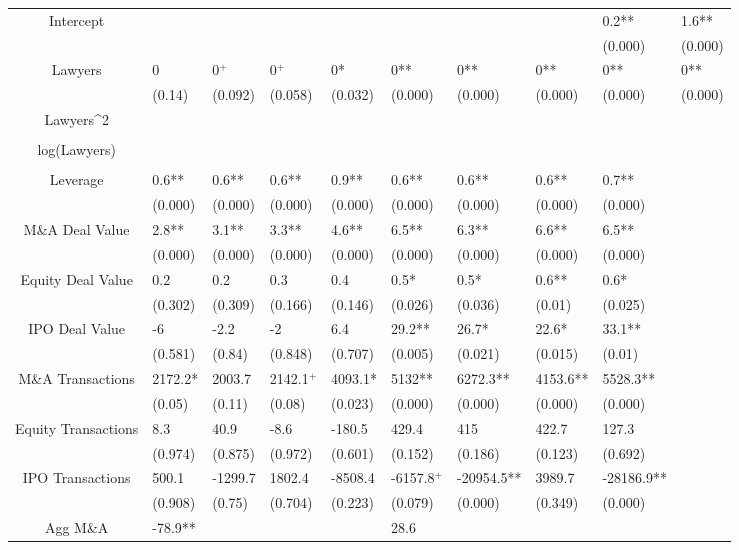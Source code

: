\documentclass{article}
\begin{document}
\begin{table}[H]
\begin{tabular}{|clllllllll|}
Intercept &  &  &  &  &  &  &  & 0.2** & 1.6** \\ 
   &  &  &  &  &  &  &  & (0.000) & (0.000) \\ 
  Lawyers & 0 & 0$^{+}$ & 0$^{+}$ & 0* & 0** & 0** & 0** & 0** & 0** \\ 
   & (0.14) & (0.092) & (0.058) & (0.032) & (0.000) & (0.000) & (0.000) & (0.000) & (0.000) \\ 
  Lawyers^2 &  &  &  &  &  &  &  &  &  \\ 
   &  &  &  &  &  &  &  &  &  \\ 
  log(Lawyers) &  &  &  &  &  &  &  &  &  \\ 
   &  &  &  &  &  &  &  &  &  \\ 
  Leverage & 0.6** & 0.6** & 0.6** & 0.9** & 0.6** & 0.6** & 0.6** & 0.7** &  \\ 
   & (0.000) & (0.000) & (0.000) & (0.000) & (0.000) & (0.000) & (0.000) & (0.000) &  \\ 
  M\&A Deal Value & 2.8** & 3.1** & 3.3** & 4.6** & 6.5** & 6.3** & 6.6** & 6.5** &  \\ 
   & (0.000) & (0.000) & (0.000) & (0.000) & (0.000) & (0.000) & (0.000) & (0.000) &  \\ 
  Equity Deal Value & 0.2 & 0.2 & 0.3 & 0.4 & 0.5* & 0.5* & 0.6** & 0.6* &  \\ 
   & (0.302) & (0.309) & (0.166) & (0.146) & (0.026) & (0.036) & (0.01) & (0.025) &  \\ 
  IPO Deal Value & -6 & -2.2 & -2 & 6.4 & 29.2** & 26.7* & 22.6* & 33.1** &  \\ 
   & (0.581) & (0.84) & (0.848) & (0.707) & (0.005) & (0.021) & (0.015) & (0.01) &  \\ 
  M\&A Transactions & 2172.2* & 2003.7 & 2142.1$^{+}$ & 4093.1* & 5132** & 6272.3** & 4153.6** & 5528.3** &  \\ 
   & (0.05) & (0.11) & (0.08) & (0.023) & (0.000) & (0.000) & (0.000) & (0.000) &  \\ 
  Equity Transactions & 8.3 & 40.9 & -8.6 & -180.5 & 429.4 & 415 & 422.7 & 127.3 &  \\ 
   & (0.974) & (0.875) & (0.972) & (0.601) & (0.152) & (0.186) & (0.123) & (0.692) &  \\ 
  IPO Transactions & 500.1 & -1299.7 & 1802.4 & -8508.4 & -6157.8$^{+}$ & -20954.5** & 3989.7 & -28186.9** &  \\ 
   & (0.908) & (0.75) & (0.704) & (0.223) & (0.079) & (0.000) & (0.349) & (0.000) &  \\ 
  Agg M\&A & -78.9** &  &  &  & 28.6 &  &  &  &  \\ 

\end{tabular}
\end{table}
\end{document}
